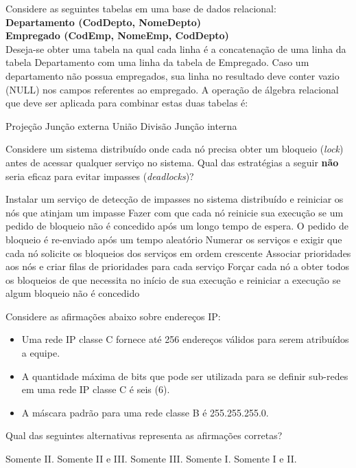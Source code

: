 \documentclass[12pt, addpoints]{exam}
\begin{document}
\begin{questions}
\question
Considere as seguintes tabelas em uma base de dados relacional:\\
\textbf{Departamento (CodDepto, NomeDepto)}\\
\textbf{Empregado (CodEmp, NomeEmp, CodDepto)}\\
Deseja-se obter uma tabela na qual cada linha é a concatenação de uma linha da tabela Departamento com uma linha da tabela de Empregado. Caso um departamento não possua empregados, sua linha no resultado deve conter vazio (NULL) nos campos referentes ao empregado. A operação de álgebra relacional que deve ser aplicada para combinar estas duas tabelas é:
\begin{choices}
\choice Projeção
\choice Junção externa
\choice União
\choice Divisão
\choice Junção interna
\end{choices}

\question
Considere um sistema distribuído onde cada nó precisa obter um bloqueio (\textit{lock}) antes de acessar qualquer serviço no sistema. Qual das estratégias a seguir \textbf{não} seria eficaz para evitar impasses (\textit{deadlocks})?
\begin{choices}
\choice Instalar um serviço de detecção de impasses no sistema distribuído e reiniciar os nós que atinjam um impasse
\choice Fazer com que cada nó reinicie sua execução se um pedido de bloqueio não é concedido após um longo tempo de espera. O pedido de bloqueio é re-enviado após um tempo aleatório
\choice Numerar os serviços e exigir que cada nó solicite os bloqueios dos serviços em ordem crescente
\choice Associar prioridades aos nós e criar filas de prioridades para cada serviço
\choice Forçar cada nó a obter todos os bloqueios de que necessita no início de sua execução e reiniciar a execução se algum bloqueio não é concedido
\end{choices}

\question
Considere as afirmações abaixo sobre endereços IP:
\begin{itemize}
    \item[I.] Uma rede IP classe C fornece até 256 endereços válidos para serem atribuídos a equipe.
    \item[II.] A quantidade máxima de bits que pode ser utilizada para se definir sub-redes em uma rede IP classe C é seis (6).
    \item[III.] A máscara padrão para uma rede classe B é 255.255.255.0.
\end{itemize}
Qual das seguintes alternativas representa as afirmações corretas?
\begin{choices}
\choice Somente II.
\choice Somente II e III.
\choice Somente III.
\choice Somente I.
\choice Somente I e II.
\end{choices}


\end{questions}
\end{document}
